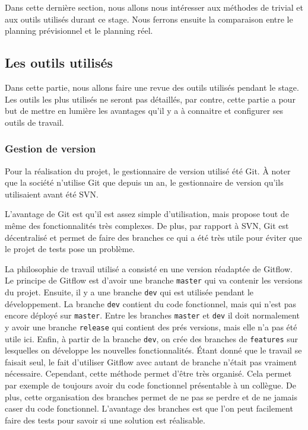 \documentclass[a4paper]{article}
\begin{document}
Dans cette dernière section, nous allons nous intéresser aux méthodes de
trivial et aux outils utilisés durant ce stage. Nous ferrons ensuite la
comparaison entre le planning prévisionnel et le planning réel.

\subsection{Les outils utilisés}%

Dans cette partie, nous allons faire une revue des outils utilisés pendant le
stage. Les outils les plus utilisés ne seront pas détaillés, par contre, cette
partie a pour but de mettre en lumière les avantages qu'il y a à connaitre et
configurer ses outils de travail.

\subsubsection{Gestion de version}%

Pour la réalisation du projet, le gestionnaire de version utilisé été Git. À
noter que la société n'utilise Git que depuis un an, le gestionnaire de version
qu'ils utilisaient avant été SVN.

L'avantage de Git est qu'il est assez simple d'utilisation, mais propose tout de
même des fonctionnalités très complexes. De plus, par rapport à SVN, Git est
décentralisé et permet de faire des branches ce qui a été très utile pour éviter
que le projet de tests pose un problème.

La philosophie de travail utilisé a consisté en une version réadaptée de Gitflow.
Le principe de Gitflow est d'avoir une branche \verb|master| qui va
contenir les versions du projet. Ensuite, il y a une branche \verb|dev| qui
est utilisée pendant le développement. La branche \verb|dev| contient du
code fonctionnel, mais qui n'est pas encore déployé sur \verb|master|. Entre
les branches \verb|master| et \verb|dev| il doit normalement y avoir
une branche \verb|release| qui contient des prés versions, mais elle n'a pas
été utile ici. Enfin, à partir de la branche \verb|dev|, on crée des
branches de \verb|features| sur lesquelles on développe les nouvelles
fonctionnalités. Étant donné que le travail se faisait seul, le fait d'utiliser
Gitflow avec autant de branche n'était pas vraiment nécessaire. Cependant, cette
méthode permet d'être très organisé. Cela permet par exemple de toujours avoir
du code fonctionnel présentable à un collègue. De plus, cette organisation des
branches permet de ne pas se perdre et de ne jamais caser du code fonctionnel.
L'avantage des branches est que l'on peut facilement faire des tests pour savoir
si une solution est réalisable.
\end{document}
